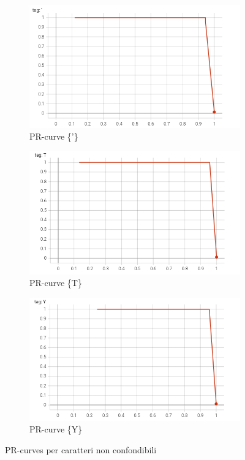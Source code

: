 \begin{figure}[htbp]
    \centering
    \begin{subfigure}[t]{0.32\textwidth}
        \centering
        \includegraphics[width=\textwidth]{images/pr_curve1.png}
        \caption{PR-curve \{'\}}
    \end{subfigure}
    \begin{subfigure}[t]{0.32\textwidth}
        \centering
        \includegraphics[width=\textwidth]{images/pr_curve2.png}
        \caption{PR-curve \{T\}}
    \end{subfigure}
    \begin{subfigure}[t]{0.32\textwidth}
        \centering
        \includegraphics[width=\textwidth]{images/pr_curve3.png}
        \caption{PR-curve \{Y\}}
    \end{subfigure}
    \caption{PR-curves per caratteri non confondibili}
    \label{fig:pr_curves}
\end{figure}

